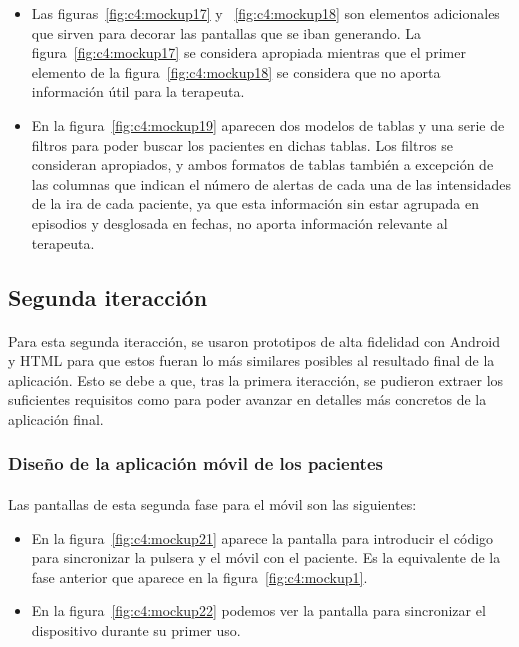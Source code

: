 \begin{itemize}
    \item Las figuras~\ref{fig:c4:mockup17} y ~\ref{fig:c4:mockup18} son elementos adicionales que sirven para decorar las pantallas que se iban generando. La figura~\ref{fig:c4:mockup17} se considera apropiada mientras que el primer elemento de la figura~\ref{fig:c4:mockup18} se considera que no aporta información útil para la terapeuta.
    \item En la figura~\ref{fig:c4:mockup19} aparecen dos modelos de tablas y una serie de filtros para poder buscar los pacientes en dichas tablas. Los filtros se consideran apropiados, y ambos formatos de tablas también a excepción de las columnas que indican el número de alertas de cada una de las intensidades de la ira de cada paciente, ya que esta información sin estar agrupada en episodios y desglosada en fechas, no aporta información relevante al terapeuta.
\end{itemize}

\subsection{Segunda iteracción}

\paragraph{}
Para esta segunda iteracción, se usaron prototipos de alta fidelidad con Android y HTML para que estos fueran lo más similares posibles al resultado final de la aplicación. Esto se debe a que, tras la primera iteracción, se pudieron extraer los suficientes requisitos como para poder avanzar en detalles más concretos de la aplicación final.

\subsubsection{Diseño de la aplicación móvil de los pacientes}

\paragraph{}
Las pantallas de esta segunda fase para el móvil son las siguientes:

\begin{itemize}
    \item En la figura~\ref{fig:c4:mockup21} aparece la pantalla para introducir el código para sincronizar la pulsera y el móvil con el paciente. Es la equivalente de la fase anterior que aparece en la figura~\ref{fig:c4:mockup1}.
    \item En la figura~\ref{fig:c4:mockup22} podemos ver la pantalla para sincronizar el dispositivo durante su primer uso.
\end{itemize}

